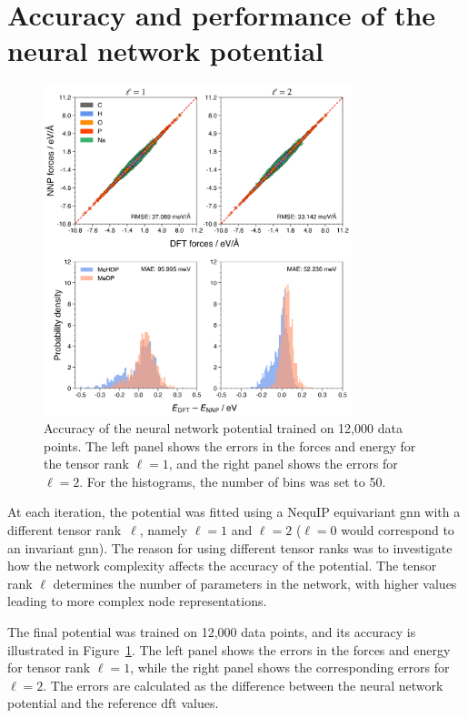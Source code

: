 \section{Accuracy and performance of the neural network potential}

\begin{figure}[b!]
    \centering
    \includegraphics[width=0.8\textwidth]{Figures/4_Results/results_nnp_accuracy_l-1_l-2.png}
    \caption{Accuracy of the neural network potential trained on 12,000 data points. The left panel shows the errors in the forces and energy for the tensor rank $\ell=1$, and the right panel shows the errors for $\ell=2$. For the histograms, the number of bins was set to 50.}
    \label{fig:nnp_accuracy}
\end{figure}

At each iteration, the potential was fitted using a NequIP equivariant \ac{gnn} with a different tensor rank~$\ell$, namely $\ell=1$ and $\ell=2$ ($\ell=0$ would correspond to an invariant \ac{gnn}). The reason for using different tensor ranks was to investigate how the network complexity affects the accuracy of the potential. The tensor rank $\ell$ determines the number of parameters in the network, with higher values leading to more complex node representations.

The final potential was trained on 12,000 data points, and its accuracy is illustrated in Figure~\ref{fig:nnp_accuracy}. The left panel shows the errors in the forces and energy for tensor rank $\ell=1$, while the right panel shows the corresponding errors for $\ell=2$. The errors are calculated as the difference between the neural network potential and the reference \ac{dft} values.

